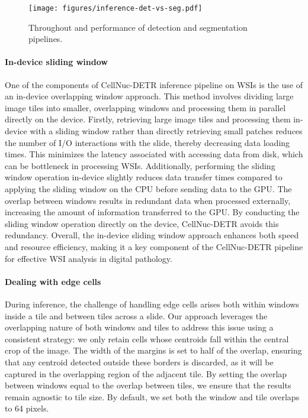  \begin{figure}
    \centering
    \texttt{[image: figures/inference-det-vs-seg.pdf]}
    \caption{Throughout and performance of detection and segmentation pipelines.}
    \label{fig:discussion:detection-vs-segmentation}
\end{figure}

\paragraph{In-device sliding window} One of the components of CellNuc-DETR inference pipeline on WSIs is the use of an in-device overlapping window approach. This method involves dividing large image tiles into smaller, overlapping windows and processing them in parallel directly on the device. Firstly, retrieving large image tiles and processing them in-device with a sliding window rather than directly retrieving small patches reduces the number of I/O interactions with the slide, thereby decreasing data loading times. This minimizes the latency associated with accessing data from disk, which can be bottleneck in processing WSIs. Additionally, performing the sliding window operation in-device slightly reduces data transfer times compared to applying the sliding window on the CPU before sending data to the GPU. The overlap between windows results in redundant data when processed externally, increasing the amount of information transferred to the GPU. By conducting the sliding window operation directly on the device, CellNuc-DETR avoids this redundancy. Overall, the in-device sliding window approach enhances both speed and resource efficiency, making it a key component of the CellNuc-DETR pipeline for effective WSI analysis in digital pathology.

\paragraph{Dealing with edge cells}  During inference, the challenge of handling edge cells arises both within windows inside a tile and between tiles across a slide. Our approach leverages the overlapping nature of both windows and tiles to address this issue using a consistent strategy: we only retain cells whose centroids fall within the central crop of the image. The width of the margins is set to half of the overlap, ensuring that any centroid detected outside these borders is discarded, as it will be captured in the overlapping region of the adjacent tile. By setting the overlap between windows equal to the overlap between tiles, we ensure that the results remain agnostic to tile size. By default, we set both the window and tile overlaps to 64 pixels.

